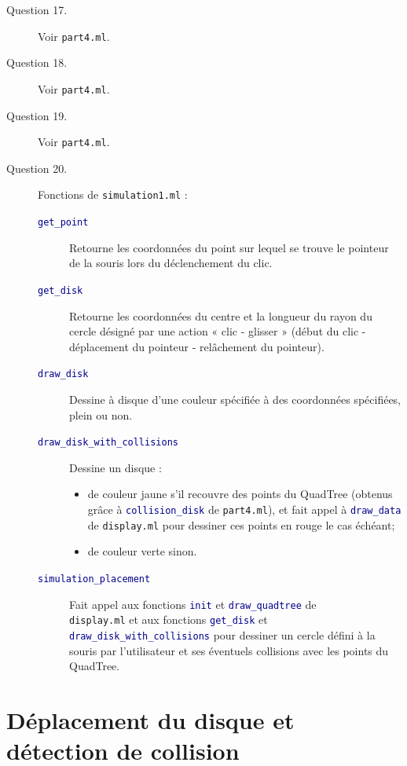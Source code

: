\documentclass[11pt]{scrartcl}
\newcommand{\funname}[1]{\texttt{\textcolor{darkblue}{#1}}}
\newcommand{\filename}[1]{\texttt{\textcolor{darkbrown}{#1}}}
\begin{document}
\begin{description}
\item[Question 17.] Voir \filename{part4.ml}.

\item[Question 18.] Voir \filename{part4.ml}.

\item[Question 19.] Voir \filename{part4.ml}.

\item[Question 20.] Fonctions de \filename{simulation1.ml} :
\begin{description}
\item[\funname{get_point}] Retourne les coordonnées du point sur lequel se trouve le pointeur de la souris lors du déclenchement du clic.
\item[\funname{get_disk}] Retourne les coordonnées du centre et la longueur du rayon du cercle désigné par une action « clic - glisser » (début du clic - déplacement du pointeur - relâchement du pointeur).
\item[\funname{draw_disk}] Dessine à disque d'une couleur spécifiée à des coordonnées spécifiées, plein ou non.
\item[\funname{draw_disk_with_collisions}] Dessine un disque :
\begin{itemize}
\item de couleur jaune s'il recouvre des points du QuadTree (obtenus grâce à \funname{collision_disk} de \filename{part4.ml}), et fait appel à \funname{draw_data} de \filename{display.ml} pour dessiner ces points en rouge le cas échéant;
\item de couleur verte sinon.
\end{itemize}
\item[\funname{simulation_placement}] Fait appel aux fonctions \funname{init} et \funname{draw_quadtree} de \\ \filename{display.ml} et aux fonctions \funname{get_disk} et \funname{draw_disk_with_collisions} pour dessiner un cercle défini à la souris par l'utilisateur et ses éventuels collisions avec les points du QuadTree.
\end{description}
\end{description}

\section{Déplacement du disque et détection de collision}
\end{document}
